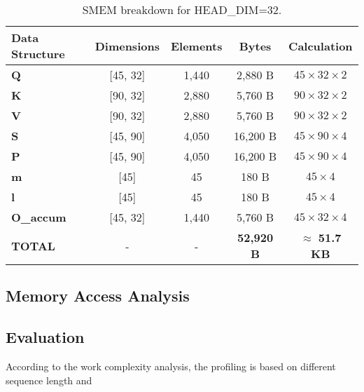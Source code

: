 \documentclass[11pt]{article}
\begin{document}
\begin{table}[h!]
\centering
\begin{tabular}{lcccc}
\toprule
\textbf{Data Structure} & \textbf{Dimensions} & \textbf{Elements} & \textbf{Bytes} & \textbf{Calculation} \\
\midrule
\textbf{Q} & [45, 32] & 1,440 & 2,880 B & $45 \times 32 \times 2$ \\
\textbf{K} & [90, 32] & 2,880 & 5,760 B & $90 \times 32 \times 2$ \\
\textbf{V} & [90, 32] & 2,880 & 5,760 B & $90 \times 32 \times 2$ \\
\textbf{S} & [45, 90] & 4,050 & 16,200 B & $45 \times 90 \times 4$ \\
\textbf{P} & [45, 90] & 4,050 & 16,200 B & $45 \times 90 \times 4$ \\
\textbf{m} & [45] & 45 & 180 B & $45 \times 4$ \\
\textbf{l} & [45] & 45 & 180 B & $45 \times 4$ \\
\textbf{O\_accum} & [45, 32] & 1,440 & 5,760 B & $45 \times 32 \times 4$ \\
\midrule
\textbf{TOTAL} & - & - & \textbf{52,920 B} & $\approx$ \textbf{51.7 KB} \\
\bottomrule
\end{tabular}
\caption{SMEM breakdown for HEAD\_DIM=32.}
\end{table}

\subsection{Memory Access Analysis}


\subsection{Evaluation}
According to the work complexity analysis, the profiling is based on different sequence length and 
\end{document}
